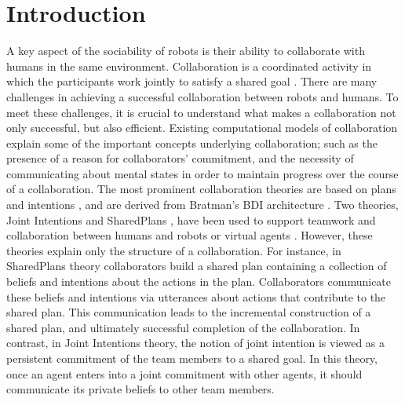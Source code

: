 \section{Introduction}
\label{intro}

A key aspect of the sociability of robots is their ability to collaborate with
humans in the same environment. Collaboration is a coordinated activity in which
the participants work jointly to satisfy a shared goal
\cite{grosz:plans-discourse}. There are many challenges in achieving a
successful collaboration between robots and humans. To meet these challenges, it
is crucial to understand what makes a collaboration not only successful, but
also efficient. Existing computational models of collaboration explain some of
the important concepts underlying collaboration; such as the presence of a
reason for collaborators' commitment, and the necessity of communicating about
mental states in order to maintain progress over the course of a collaboration.
The most prominent collaboration theories are based on plans and intentions
\cite{cohen:teamwork} \cite{grosz:plans-discourse}
\cite{Litman:discourse-commonsense}, and are derived from Bratman's BDI
architecture \cite{bratman:intentions-plans}. Two theories, Joint Intentions
\cite{cohen:teamwork} and SharedPlans
\cite{grosz:planning-acting,grosz:collaboration,grosz:plans-discourse}, have
been used to support teamwork and collaboration between humans and robots or
virtual agents \cite{breazeal:humanoid-robots}
\cite{montreuil:planning-robot-activity} \cite{sidner:enagagement-robot}
\cite{yen:cast}. However, these theories explain only the structure of a
collaboration. For instance, in SharedPlans theory collaborators build a shared
plan containing a collection of beliefs and intentions about the actions in the
plan. Collaborators communicate these beliefs and intentions via utterances
about actions that contribute to the shared plan. This communication leads to
the incremental construction of a shared plan, and ultimately successful
completion of the collaboration. In contrast, in Joint Intentions theory, the
notion of joint intention is viewed as a persistent commitment of the team
members to a shared goal. In this theory, once an agent enters into a joint
commitment with other agents, it should communicate its private beliefs to other
team members.

